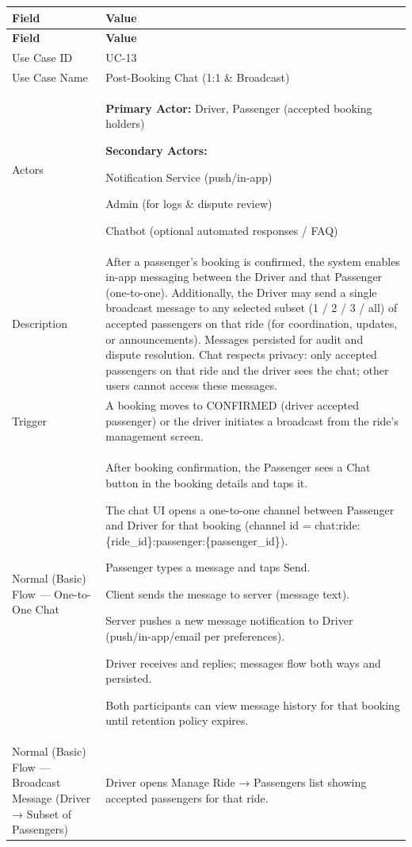 \begin{longtable}{|p{3.5cm}|p{12cm}|}
\hline
\rowcolor{lightgray!30}
\textbf{Field} & \textbf{Value} \\
\hline
\endfirsthead
\hline
\rowcolor{lightgray!30}
\textbf{Field} & \textbf{Value} \\
\hline
\endhead
\hline
\endfoot
Use Case ID & UC-13 \\
\hline
Use Case Name & Post-Booking Chat (1:1 \& Broadcast) \\
\hline
Actors &
\textbf{Primary Actor:} Driver, Passenger (accepted booking holders)

\textbf{Secondary Actors:}

Notification Service (push/in-app)

Admin (for logs \& dispute review)

Chatbot (optional automated responses / FAQ) \\
\hline
Description &
After a passenger’s booking is confirmed, the system enables in-app messaging between the Driver and that Passenger (one-to-one). Additionally, the Driver may send a single broadcast message to any selected subset (1 / 2 / 3 / all) of accepted passengers on that ride (for coordination, updates, or announcements). Messages persisted for audit and dispute resolution. Chat respects privacy: only accepted passengers on that ride and the driver sees the chat; other users cannot access these messages. \\
\hline
Trigger &
A booking moves to CONFIRMED (driver accepted passenger) or the driver initiates a broadcast from the ride’s management screen. \\
\hline
Normal (Basic) Flow — One-to-One Chat &
After booking confirmation, the Passenger sees a Chat button in the booking details and taps it.

The chat UI opens a one-to-one channel between Passenger and Driver for that booking (channel id = chat:ride:\{ride\_id\}:passenger:\{passenger\_id\}).

Passenger types a message and taps Send.

Client sends the message to server (message text).

Server pushes a new message notification to Driver (push/in-app/email per preferences).

Driver receives and replies; messages flow both ways and persisted.

Both participants can view message history for that booking until retention policy expires. \\
\hline
Normal (Basic) Flow — Broadcast Message (Driver → Subset of Passengers) &
Driver opens Manage Ride → Passengers list showing accepted passengers for that ride.


\end{longtable}
